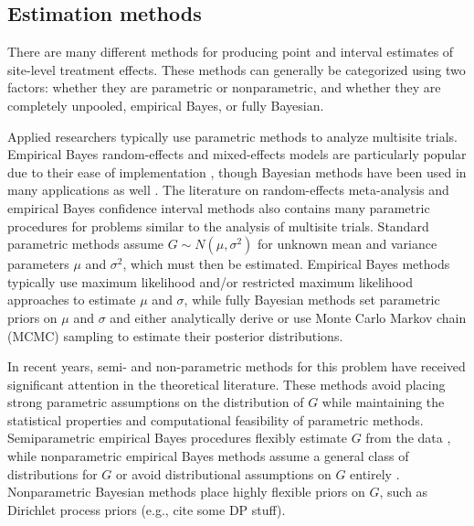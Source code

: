 \documentclass[]{article}
\begin{document}
\subsection{Estimation methods}

There are many different methods for producing point and interval estimates of site-level treatment effects.
These methods can generally be categorized using two factors: whether they are parametric or nonparametric, and whether they are completely unpooled, empirical Bayes, or fully Bayesian.

Applied researchers typically use parametric methods to analyze multisite trials.
Empirical Bayes random-effects and mixed-effects models are particularly popular due to their ease of implementation \citep{bloom2017using}, though Bayesian methods have been used in many applications as well \citep{rubin1981estimation}.
The literature on random-effects meta-analysis \citep{higgins2009re} and empirical Bayes confidence interval methods \citep{morris1983parametric, he1992parametric, gene2009empirical} also contains many parametric procedures for problems similar to the analysis of multisite trials.
Standard parametric methods assume $G \sim N(\mu, \sigma^2)$ for unknown mean and variance parameters $\mu$ and $\sigma^2$, which must then be estimated.
Empirical Bayes methods typically use maximum likelihood and/or restricted maximum likelihood approaches to estimate $\mu$ and $\sigma$, while fully Bayesian methods set parametric priors on $\mu$ and $\sigma$ and either analytically derive or use Monte Carlo Markov chain (MCMC) sampling to estimate their posterior distributions.

In recent years, semi- and non-parametric methods for this problem have received significant attention in the theoretical literature.
These methods avoid placing strong parametric assumptions on the distribution of $G$ while maintaining the statistical properties and computational feasibility of parametric methods.
Semiparametric empirical Bayes procedures flexibly estimate $G$ from the data \citep{laird1987empirical, tseng1997good, yu2018adaptive}, while nonparametric empirical Bayes methods assume a general class of distributions for $G$ \citep{ignatiadis2022confidence} or avoid distributional assumptions on $G$ entirely \citep{armstrong2020robust}.
Nonparametric Bayesian methods place highly flexible priors on $G$, such as Dirichlet process priors (e.g., cite some DP stuff).
\end{document}
